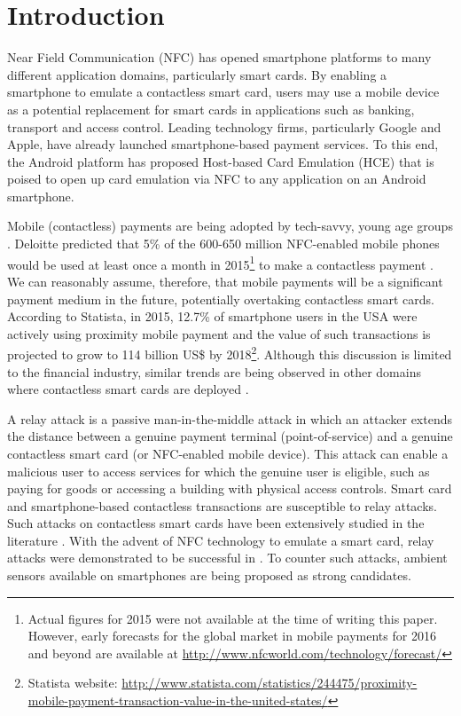 \documentclass[runningheads,a4paper]{llncs}
\begin{document}
\section{Introduction}\label{Introduction}
Near Field Communication (NFC) \cite{Coskun2013} has opened smartphone platforms to many different application domains, particularly smart cards. By enabling a smartphone to emulate a contactless smart card, users may use a mobile device as a potential replacement for smart cards in applications such as banking, transport and access control.   Leading technology firms, particularly Google and Apple, have already launched smartphone-based payment services.  To this end, the Android platform has proposed Host-based Card Emulation (HCE) \cite{umar2015performance} that is poised to open up card emulation via NFC to any application on an Android smartphone.

Mobile (contactless) payments are being adopted by tech-savvy, young age groups \cite{UKCardsPayment2015a}.  Deloitte predicted that 5\% of the 600-650 million NFC-enabled mobile phones would be used at least once a month in 2015\footnote{Actual figures for 2015 were not available at the time of writing this paper. However, early forecasts for the global market in mobile payments for 2016 and beyond are available at \url{http://www.nfcworld.com/technology/forecast/}} to make a contactless payment \cite{Deloitte2015}.  We can reasonably assume, therefore, that mobile payments will be a significant payment medium in the future, potentially overtaking contactless smart cards. According to Statista, in 2015, 12.7\% of smartphone users in the USA were actively using proximity mobile payment and  the value of such transactions is projected to grow to 114 billion US\$ by 2018\footnote{Statista website: \url{http://www.statista.com/statistics/244475/proximity-mobile-payment-transaction-value-in-the-united-states/}}. Although this discussion is limited to the financial industry, similar trends are being observed in other domains where contactless smart cards are deployed \cite{VeriFone2010}.

A relay attack is a passive man-in-the-middle attack in which an attacker extends the distance between a genuine payment terminal (point-of-service) and a genuine contactless smart card (or NFC-enabled mobile device). This attack can enable a malicious user to access services for which the genuine user is eligible, such as paying for goods or accessing a building with physical access controls. Smart card and smartphone-based contactless transactions are susceptible to relay attacks. Such attacks on contactless smart cards have been extensively studied in the literature \cite{DrimerM07,Francillon11,Hancke2009615,kfir2005picking}. With the advent of NFC technology to emulate a smart card, relay attacks were demonstrated to be successful in \cite{Francis:2010:PNP:1926325.1926331,FrancisHMM11,5741305}. To counter such attacks, ambient sensors available on smartphones are being proposed \cite{Halevi2012,6378376,shrestha2014drone,truong2014comparing,Urien201428,Varshavsky2007} as strong candidates. 
\end{document}
